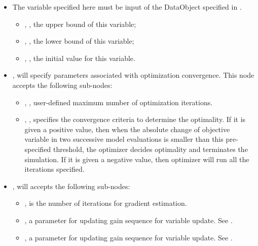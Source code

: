 \begin{itemize}
\item \variableDescription
 The variable specified here must be input of the DataObject specified in .
 \variableChildrenIntro
 \begin{itemize}
    \item {}, , the upper bound of this variable;
    \item {}, , the lower bound of this variable;
    \item {}, , the initial value for this variable.
  \end{itemize}
\end{itemize}
\begin{itemize}
\item {},  will specify parameters associated with optimization convergence. This node accepts the following sub-nodes:
  \begin{itemize}
  \item {}, , user-defined maximum number of optimization iterations.
  \item {}, , specifies the convergence criteria to determine the optimality. If it is given a positive value, then when the absolute change of objective variable in two successive model evaluations is smaller than this pre-specified threshold, the  optimizer decides optimality and terminates the simulation. If it is given a negative value, then  optimizer will run all the iterations specified. 
  \end{itemize}
\item {},  will accepts the following sub-nodes:
  \begin{itemize}
  \item {},  is the number of iterations for gradient estimation.
  \item {},  a parameter for updating gain sequence for variable update. See \cite{spall1998implementation}.
  \item {},  a parameter for updating gain sequence for variable update. See \cite{spall1998implementation}.

\end{itemize}
\end{itemize}
